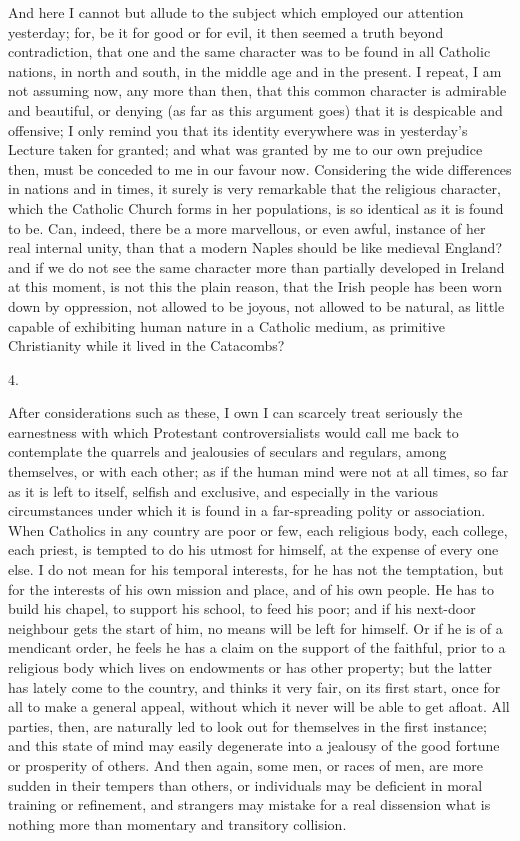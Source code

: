 And here I cannot but allude to the subject which employed our
attention yesterday; for, be it for good or for evil, it then seemed a
truth beyond contradiction, that one and the same character was to be
found in all Catholic nations, in north and south, in the middle age
and in the present. I repeat, I am not assuming now, any more than
then, that this common character is admirable and beautiful, or
denying (as far as this argument goes) that it is despicable and
offensive; I only remind you that its identity everywhere was in
yesterday's Lecture taken for granted; and what was granted by me to
our own prejudice then, must be conceded to me in our favour now.
Considering the wide differences in nations and in times, it surely is
very remarkable that the religious character, which the Catholic
Church forms in her populations, is so identical as it is found to be.
Can, indeed, there be a more marvellous, or even awful, instance of
her real internal unity, than that a modern Naples should be like
medieval England? and if we do not see the same character more than
partially developed in Ireland at this moment, is not this the plain
reason, that the Irish people has been worn down by oppression, not
allowed to be joyous, not allowed to be natural, as little capable of
exhibiting human nature in a Catholic medium, as primitive
Christianity while it lived in the Catacombs?

4.

After considerations such as these, I own I can scarcely treat
seriously the earnestness with which Protestant controversialists
would call me back to contemplate the quarrels and jealousies of
seculars and regulars, among themselves, or with each other; as if the
human mind were not at all times, so far as it is left to itself,
selfish and exclusive, and especially in the various circumstances
under which it is found in a far-spreading polity or association. When
Catholics in any country are poor or few, each religious body, each
college, each priest, is tempted to do his utmost for himself, at the
expense of every one else. I do not mean for his temporal interests,
for he has not the temptation, but for the interests of his own
mission and place, and of his own people. He has to build his chapel,
to support his school, to feed his poor; and if his next-door
neighbour gets the start of him, no means will be left for himself. Or
if he is of a mendicant order, he feels he has a claim on the support
of the faithful, prior to a religious body which lives on endowments
or has other property; but the latter has lately come to the country,
and thinks it very fair, on its first start, once for all to make a
general appeal, without which it never will be able to get afloat. All
parties, then, are naturally led to look out for themselves in the
first instance; and this state of mind may easily degenerate into a
jealousy of the good fortune or prosperity of others. And then again,
some men, or races of men, are more sudden in their tempers than
others, or individuals may be deficient in moral training or
refinement, and strangers may mistake for a real dissension what is
nothing more than momentary and transitory collision.

